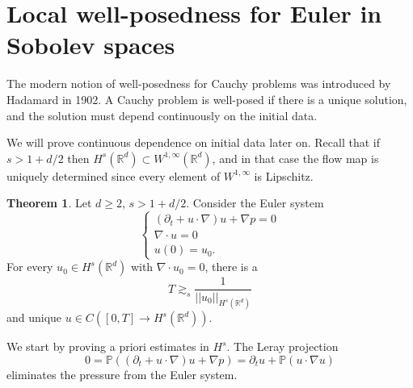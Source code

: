 \documentclass[12pt]{book}
\newcommand{\RR}{\mathbb{R}}
\newcommand{\PP}{\mathbb{P}}
\theoremstyle{definition}
\newtheorem{theorem}{Theorem}[chapter]
\begin{document}
\section{Local well-posedness for Euler in Sobolev spaces}
The modern notion of well-posedness for Cauchy problems was introduced by Hadamard in 1902.
A Cauchy problem is well-posed if there is a unique solution, and the solution must depend continuously on the initial data.

We will prove continuous dependence on initial data later on.
Recall that if $s > 1 + d/2$ then $H^s(\RR^d) \subset W^{1, \infty}(\RR^d)$, and in that case the flow map is uniquely determined since every element of $W^{1,\infty}$ is Lipschitz.

\begin{theorem}
Let $d \geq 2$, $s > 1+d/2$. Consider the Euler system
\begin{equation}
\label{Euler well posed}
\begin{cases}
(\partial_t + u \cdot \nabla)u + \nabla p = 0\\
\nabla \cdot u = 0 \\
u(0) = u_0.
\end{cases}
\end{equation}
For every $u_0 \in H^s(\RR^d)$ with $\nabla \cdot u_0 = 0$, there is a
$$T \gtrsim_s \frac{1}{||u_0||_{H^s(\RR^d)}}$$
and unique $u \in C([0, T] \to H^s(\RR^d))$.
\end{theorem}

We start by proving a priori estimates in $H^s$.
The Leray projection
\begin{equation}
\label{Leray Euler well posed}
0 = \PP((\partial_t + u \cdot \nabla)u + \nabla p) = \partial_t u + \PP(u \cdot \nabla u)
\end{equation}
eliminates the pressure from the Euler system.
\end{document}
